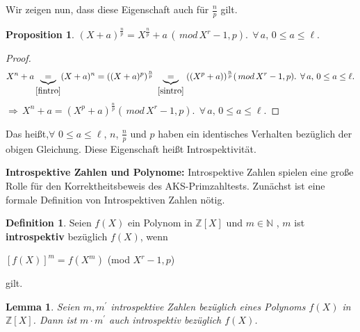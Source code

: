 \documentclass[12pt,oneside]{article}
\newtheorem{lemma}[theorem]{Lemma}
\newtheorem{prop}{Proposition}[section]
\theoremstyle{remark}
\theoremstyle{definition}
\newtheorem{definition}{Definition}[section]
\begin{document}
Wir zeigen nun, dass diese Eigenschaft auch für $\frac{n}{p}$ gilt.\newline

\begin{prop}
$(X + a)^{\frac{n}{p}} = X^{\frac{n}{p}} + a \, (\, mod \, X^r -1,p). \; \, \forall\,a, \,  0 \leq a \leq \ell.$
\end{prop}

\begin{proof}
\begin{align*}
    X^{n} + a \underbrace{=}_{\ref{fintro}} (X + a)^n = ((X + a)^{p})^{\frac{n}{p}} \; \underbrace{=}_{\ref{sintro}} \; ((X^{p} + a))^{\frac{n}{p}} (\, mod \, X^r - 1,p). \; \, \forall\,a, \, 0 \leq a \leq \ell.
\end{align*}
$\Rightarrow \, X^{n} + a = (X^{p} + a)^{\frac{n}{p}} (\, mod \, X^r - 1,p). \; \, \forall\,a, \, 0 \leq a \leq \ell.$
\end{proof}

Das heißt,$\forall$ $0 \leq a \leq \ell$, $n$, $\frac{n}{p}$ und $p$ haben ein identisches Verhalten bezüglich der obigen Gleichung. Diese Eigenschaft heißt Introspektivität.\newline    


\textbf{Introspektive Zahlen und Polynome:}
Introspektive Zahlen spielen eine große Rolle für den Korrektheitsbeweis des AKS-Primzahltests. Zunächst ist eine formale Definition von Introspektiven Zahlen nötig.

\begin{definition}
Seien $f(X)$ ein Polynom in $\mathbb{Z}[X]$ und $m \in \mathbb{N}$ , $m$ ist \textbf{introspektiv} bezüglich $f(X)$, wenn\newline\newline
    \centerline{$[f(X)]^{m} = f(X^m)$ (mod $X^r - 1,p$)} 
gilt. 
\end{definition}

\smallskip

\begin{lemma}\label{intros_num}
Seien $m,m^{'}$ introspektive Zahlen bezüglich eines Polynoms $f(X)$ in $\mathbb{Z}[X]$. Dann ist $m \cdot m^{'}$ auch introspektiv bezüglich $f(X)$.
\end{lemma}
\end{document}
